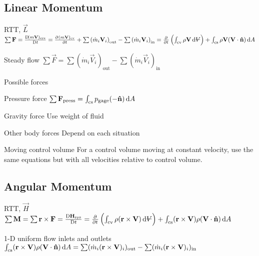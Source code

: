 \documentclass{article}
\begin{document}
\subsection{Linear Momentum}
\begin{description*}
\item[RTT, $\vec{L}$]
  \(\sum{\vec{F}}
  = \frac{\Dif (m\vec{V})_\mathrm{sys}}{\Dif t}
  = \pd{(m\vec{V})_\mathrm{cv}}{t}
  + \sum\left(\dot{m}_i\vec{V}_i\right)_\mathrm{out}
  - \sum\left(\dot{m}_i\vec{V}_i\right)_\mathrm{in}
  = \pd{}{t}\left(\int_\mathrm{cv}\rho\vec{V}\dif{\volsym}\right)
  + \int_\mathrm{cs}\rho\vec{V}(\vec{V}\cdot\uvec{n})\dif{A}\)
\item[Steady flow]
  \(\sum{\vec{F}}
  = \sum\left(\dot{m}_i\vec{V}_i\right)_\mathrm{out}
  - \sum\left(\dot{m}_i\vec{V}_i\right)_\mathrm{in}\)
\item[Possible forces]~
  \begin{description*}
    \item[Pressure force]
      \(\sum\vec{F}_\mathrm{press} = \int_\mathrm{cs}p_\mathrm{gage}(-\uvec{n})\dif{A}\)
    \item[Gravity force] Use weight of fluid
    \item[Other body forces] Depend on each situation
  \end{description*}
\item[Moving control volume] For a control volume moving at constant velocity, use the same
  equations but with all velocities relative to control volume.
\end{description*}

\subsection{Angular Momentum}
\begin{description*}
\item[RTT, $\vec{H}$]
  \(\sum\vec{M} = \sum\vec{r}\times\vec{F}
  = \frac{\Dif \vec{H}_\mathrm{sys}}{\Dif t}
  = \pd{}{t}\left(\int_\mathrm{cv}\rho(\vec{r}\times\vec{V})\dif{\volsym}\right)
  + \int_\mathrm{cs}(\vec{r}\times\vec{V})\rho(\vec{V}\cdot\uvec{n})\dif{A}\)
\item[1-D uniform flow inlets and outlets]
  \(\int_\mathrm{cs}(\vec{r}\times\vec{V})\rho(\vec{V}\cdot\uvec{n})\dif{A}
  = \sum(\dot{m}_i(\vec{r}\times\vec{V})_i)_\mathrm{out}
  - \sum(\dot{m}_i(\vec{r}\times\vec{V})_i)_\mathrm{in}\)
\end{description*}
\end{document}

